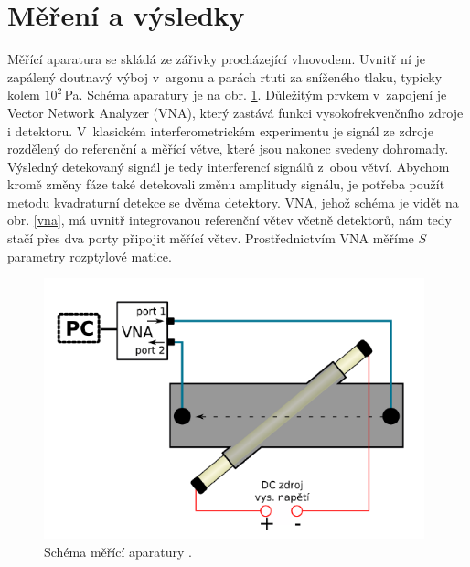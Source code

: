 \documentclass[a4paper,12pt]{article}
\begin{document}

\section{Měření a výsledky}
Měřící aparatura se skládá ze zářivky procházející vlnovodem. Uvnitř ní je
zapálený doutnavý výboj v~argonu a parách rtuti 
za sníženého tlaku, typicky kolem $10^2$\,\si{\pascal}. Schéma aparatury je na 
obr.
\ref{schema}. Důležitým prvkem v~zapojení je Vector Network Analyzer (VNA),
který zastává funkci vysokofrekvenčního zdroje i detektoru.
V~klasickém interferometrickém experimentu je signál ze zdroje rozdělený do
referenční a měřící větve, které jsou nakonec svedeny dohromady. Výsledný 
detekovaný signál je tedy interferencí signálů z~obou větví. Abychom kromě 
změny fáze také detekovali změnu amplitudy signálu, je potřeba použít metodu 
kvadraturní detekce se dvěma detektory. VNA, jehož schéma je vidět na 
obr. \ref{vna}, má uvnitř integrovanou referenční větev včetně detektorů, 
nám tedy stačí přes dva porty připojit měřící větev. Prostřednictvím VNA měříme $S$ parametry rozptylové matice.

\begin{figure}[h]
	\centering
	\includegraphics[width=110mm]{schema.png}
	\caption{Schéma měřící aparatury \cite{navod}.}
	\label{schema}
\end{figure}
\end{document}
